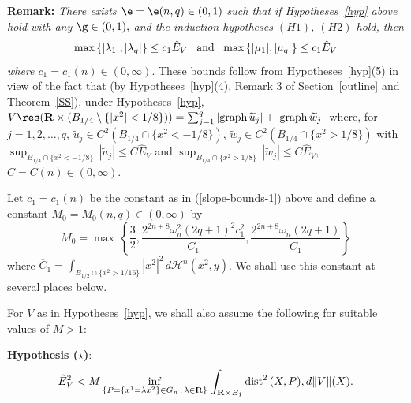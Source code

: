 \documentclass[a4paper,11pt]{amsart}
\begin{document}
\noindent
{\bf Remark:} \emph{There exists $\e = \e(n, q) \in (0, 1)$ such that  if Hypotheses~\ref{hyp} above hold with any $\g \in (0, 1),$ and the induction hypotheses $(H1)$, $(H2)$ hold, then 
\begin{equation}\label{slope-bounds-1}
{\rm max} \, \{|\lambda_{1}|, |\lambda_{q}|\} \leq c_{1} {\hat E}_{V} \;\;\; {\rm and} \;\;\; {\rm max} \, \{|\mu_{1}|, |\mu_{q}|\} \leq c_{1} {\hat E}_{V}
\end{equation}
where $c_{1} = c_{1}(n) \in (0, \infty).$}  These bounds follow from Hypotheses~\ref{hyp}(5) in view of the fact that (by Hypotheses~\ref{hyp}(4), Remark 3 of Section~\ref{outline} and Theorem~\ref{SS}), under Hypotheses~\ref{hyp}, 
$V \res ({\mathbf R} \times (B_{1/4} \setminus \{|x^{2}| < 1/8\})) = \sum_{j=1}^{q} |{\rm graph} \, \widetilde{u}_{j}| + |{\rm graph} \, \widetilde{w}_{j}|$ where, for $j=1, 2, \ldots, q$, 
$\widetilde{u}_{j} \in C^{2}(B_{1/4} \cap \{x^{2} < -1/8\})$, $\widetilde{w}_{j} \in C^{2}(B_{1/4} \cap \{x^{2} > 1/8\})$ with $\sup_{B_{1/4} \cap \{x^{2} < -1/8\}} \, |\widetilde{u}_{j}| \leq C {\hat E}_{V}$ and $\sup_{B_{1/4} \cap \{x^{2} > 1/8\}} \, |\widetilde{w}_{j}| \leq C {\hat E}_{V},$ $C = C(n) \in (0, \infty).$


Let $c_{1} = c_{1}(n)$ be the constant as in (\ref{slope-bounds-1}) above and define a constant $M_{0} = M_{0}(n, q) \in (0, \infty)$ by 
$$M_{0} = \max \, \left\{\frac{3}{2}, \frac{2^{2n+8}\omega_{n}^{2}(2q+1)^{2}c_{1}^{2}}{\overline{C}_{1}}, \frac{2^{2n+8}\omega_{n}(2q+1)}{\overline{C}_{1}}\right\}$$ where $\overline{C}_{1} = \int_{B_{1/2} \cap \{x^{2} >1/16\}} |x^{2}|^{2} \, d{\mathcal H}^{n}(x^{2}, y)$. We shall use this constant 
at several places below.

For $V$ as in Hypotheses~\ref{hyp}, we shall also assume the following for suitable values of $M > 1$:

\noindent
{\bf Hypothesis ($\star$)}: 
\begin{equation*}
{\hat E}_{V}^{2} < M\inf_{\{P = \{x^{1} = \lambda x^{2}\} \in G_{n} \, : \, \lambda \in {\mathbf R}\}} \, \int_{{\mathbf R} \times B_{1}} {\rm dist}^{2} \, (X, P) , d\|V\|(X).
\end{equation*}
\end{document}

